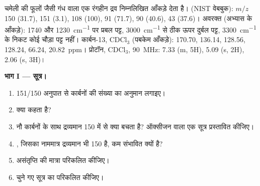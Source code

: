 \begin{problem}
\label{pb:b2:structure-determination:1}
चमेली की फूलों जैसी गंध वाला एक रंगहीन द्रव निम्नलिखित आँकड़े देता है।  (NIST
वेबबुक): $m/z$ 150 (31.7), 151 (3.1), 108 (100), 91 (71.7), 90 (40.6), 43 (37.6)। अवरक्त (अभ्यास के
आँकड़े): 1740 और \qty{1230}{cm^{-1}} पर प्रबल पट्ट, \qty{3000}{cm^{-1}} से ठीक ऊपर दुर्बल पट्ट,
\qty{3300}{cm^{-1}} के निकट कोई चौड़ा पट्ट नहीं। कार्बन-13, CDCl$_3$ (पबकेम आँकड़े): 170.70, 136.14, 128.56,
128.24, 66.24, 20.82~ppm। प्रोटॉन, CDCl$_3$, \qty{90}{MHz}: 7.33 (m, 5H), 5.09 (s, 2H), 2.06 (s, 3H)।

\begin{center}
\end{center}

\medskip
\noindent\textbf{भाग I --- सूत्र।}
\begin{enumerate}
  \item 151/150 अनुपात से कार्बनों की संख्या का अनुमान लगाइए।
  \item {} क्या कहता है?
  \item नौ कार्बनों के साथ द्रव्यमान 150 में से क्या बचता है? ऑक्सीजन वाला एक सूत्र प्रस्तावित कीजिए।
  \item {}, जिसका नाममात्र द्रव्यमान भी 150 है, कम संभावित क्यों है?
  \item असंतृप्ति की मात्रा परिकलित कीजिए।
  \item चुने गए सूत्र का  परिकलित कीजिए।
\end{enumerate}


\end{problem}
